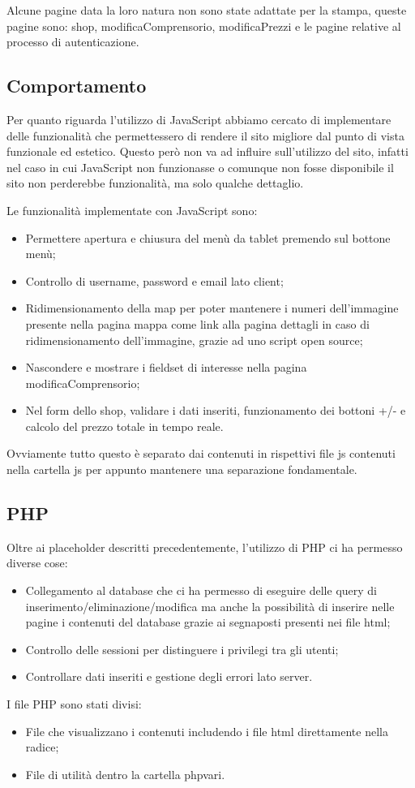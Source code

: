 Alcune pagine data la loro natura non sono state adattate per la stampa, queste pagine sono: shop, modificaComprensorio, modificaPrezzi e le pagine relative al processo di autenticazione.

\subsection{Comportamento}

Per quanto riguarda l'utilizzo di JavaScript abbiamo cercato di implementare delle funzionalità che permettessero di rendere il sito migliore dal punto di vista funzionale ed estetico.
Questo però non va ad influire sull'utilizzo del sito, infatti nel caso in cui JavaScript non funzionasse o comunque non fosse disponibile il sito non perderebbe funzionalità, ma solo qualche dettaglio.

Le funzionalità implementate con JavaScript sono:
\begin{itemize}
    \item Permettere apertura e chiusura del menù da tablet premendo sul bottone menù;
    \item Controllo di username, password e email lato client;
    \item Ridimensionamento della map per poter mantenere i numeri dell'immagine presente nella pagina mappa come link alla pagina dettagli in caso di ridimensionamento dell'immagine, grazie ad uno script open source;
    \item Nascondere e mostrare i fieldset di interesse nella pagina modificaComprensorio;
    \item Nel form dello shop, validare i dati inseriti, funzionamento dei bottoni +/- e calcolo del prezzo totale in tempo reale.
\end{itemize}

Ovviamente tutto questo è separato dai contenuti in rispettivi file js contenuti nella cartella js per appunto mantenere una separazione fondamentale.

\subsection{PHP}

Oltre ai placeholder descritti precedentemente, l'utilizzo di PHP ci ha permesso diverse cose:
\begin{itemize}
    \item Collegamento al database che ci ha permesso di eseguire delle query di inserimento/eliminazione/modifica ma anche la possibilità
        di inserire nelle pagine i contenuti del database grazie ai segnaposti presenti nei file html;
    \item Controllo delle sessioni per distinguere i privilegi tra gli utenti;
    \item Controllare dati inseriti e gestione degli errori lato server.
\end{itemize}

I file PHP sono stati divisi:
\begin{itemize}
    \item File che visualizzano i contenuti includendo i file html direttamente nella radice;
    \item File di utilità dentro la cartella php\textunderscore vari.
\end{itemize}